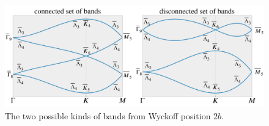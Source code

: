 \begin{figure}[H]
\centering
\includegraphics[width=\linewidth]{fig/bands_con_discon.png}
\caption{The two possible kinds of bands from Wyckoff position $2b$.}
\label{fig:bands_con_discon}
\end{figure}







%
%
%

